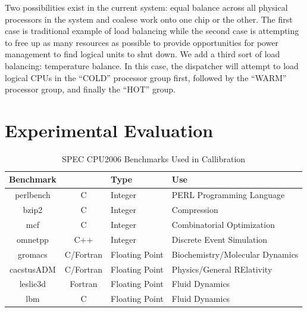 \documentclass[acmtaco]{acmtrans2m}
\begin{document}
Two possibilities exist in the current system: equal balance across all
physical processors in the system and coalese work onto one chip or the
other.  The first case is traditional example of load balancing while
the second case is attempting to free up as many resources as possible
to provide opportunities for power management to find logical units to
shut down.   We add a third sort of load balancing: temperature
balance. In this case, the dispatcher will attempt to load logical CPUs
in the ``COLD'' processor group first, followed by the ``WARM''
processor group, and finally the ``HOT'' group.


\section{Experimental Evaluation}
\label{sec:experiment}

\begin{table}
  \centering
  \caption{SPEC CPU2006 Benchmarks Used in Callibration}
  \label{tab:specbenchs}
  \begin{tabular}{c c l l}
    \hline
    Benchmark& &Type&Use\\
    \hline
    perlbench&C&Integer&PERL Programming Language\\
    bzip2&C&Integer&Compression\\
    mcf&C&Integer&Combinatorial Optimization\\
    omnetpp&C++&Integer&Discrete Event Simulation\\
    \hline
    gromacs&C/Fortran&Floating Point&Biochemistry/Molecular Dynamics\\
    cacstusADM&C/Fortran&Floating Point&Physics/General RElativity\\
    leslie3d&Fortran&Floating Point&Fluid Dynamics\\
    lbm&C&Floating Point&Fluid Dynamics\\
    \hline \hline
  \end{tabular}
\end{table}
\end{document}
